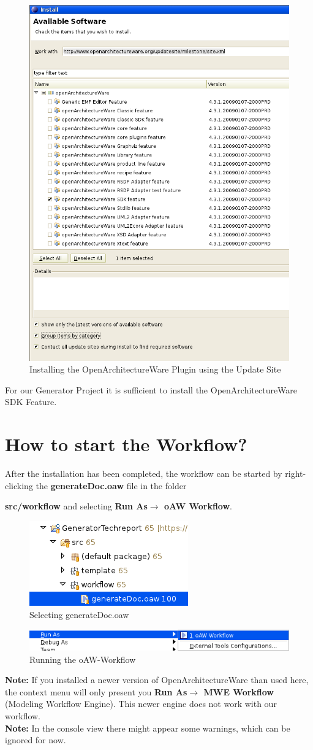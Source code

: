 \begin{figure}[htbp]
  \centering
  \includegraphics[width=0.5\linewidth]{figures/OAW-UpdateSite}
  \caption{Installing the OpenArchitectureWare Plugin using the Update Site}
\end{figure}

For our Generator Project it is sufficient to install the OpenArchitectureWare
SDK Feature.

\section{How to start the Workflow?}
After the installation has been completed, the workflow can be started by
right-clicking the \textbf{generateDoc.oaw} file in the folder

\textbf{src/workflow} and selecting \textbf{Run As$\to$ oAW Workflow}.

\begin{figure}[htbp]
  \centering
  \includegraphics[width=0.5\linewidth]{figures/OAW-WorkflowFile}
  \caption{Selecting generateDoc.oaw}
\end{figure}

\begin{figure}[htbp]
  \centering
  \includegraphics[width=1\linewidth]{figures/OAW-RunAs}
  \caption{Running the oAW-Workflow}
\end{figure}

\textbf{Note:} If you installed a newer version of OpenArchitectureWare than
used here, the context menu will only present you \textbf{Run As$\to$ MWE
Workflow} (Modeling Workflow Engine). This newer engine does not work with our
workflow.\\

\textbf{Note:} In the console view there might appear some warnings, which can
be ignored for now.